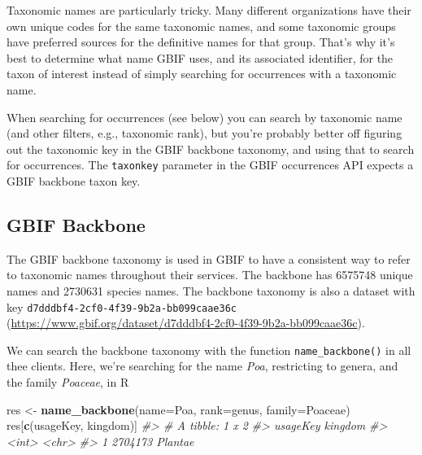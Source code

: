 \documentclass[3p]{elsarticle} %
\newenvironment{Shaded}{\begin{snugshade}}{\end{snugshade}}
\newcommand{\CommentTok}[1]{\textcolor[rgb]{0.56,0.35,0.01}{\textit{#1}}}
\newcommand{\DataTypeTok}[1]{\textcolor[rgb]{0.13,0.29,0.53}{#1}}
\newcommand{\KeywordTok}[1]{\textcolor[rgb]{0.13,0.29,0.53}{\textbf{#1}}}
\newcommand{\NormalTok}[1]{#1}
\newcommand{\StringTok}[1]{\textcolor[rgb]{0.31,0.60,0.02}{#1}}
\begin{document}
Taxonomic names are particularly tricky. Many different organizations
have their own unique codes for the same taxonomic names, and some
taxonomic groups have preferred sources for the definitive names for
that group. That's why it's best to determine what name GBIF uses, and
its associated identifier, for the taxon of interest instead of simply
searching for occurrences with a taxonomic name.

When searching for occurrences (see below) you can search by taxonomic
name (and other filters, e.g., taxonomic rank), but you're probably
better off figuring out the taxonomic key in the GBIF backbone taxonomy,
and using that to search for occurrences. The \texttt{taxonkey}
parameter in the GBIF occurrences API expects a GBIF backbone taxon key.

\hypertarget{gbif-backbone}{%
\subsection{GBIF Backbone}\label{gbif-backbone}}

The GBIF backbone taxonomy is used in GBIF to have a consistent way to
refer to taxonomic names throughout their services. The backbone has
6575748 unique names and 2730631 species names. The backbone taxonomy is
also a dataset with key \texttt{d7dddbf4-2cf0-4f39-9b2a-bb099caae36c}
(\url{https://www.gbif.org/dataset/d7dddbf4-2cf0-4f39-9b2a-bb099caae36c}).

We can search the backbone taxonomy with the function
\texttt{name\_backbone()} in all thee clients. Here, we're searching for
the name \emph{Poa}, restricting to genera, and the family
\emph{Poaceae}, in R

\begin{Shaded}
\begin{Highlighting}[]
\NormalTok{res <{-}}\StringTok{ }\KeywordTok{name\_backbone}\NormalTok{(}\DataTypeTok{name=}\StringTok{\textquotesingle{}Poa\textquotesingle{}}\NormalTok{, }\DataTypeTok{rank=}\StringTok{\textquotesingle{}genus\textquotesingle{}}\NormalTok{, }\DataTypeTok{family=}\StringTok{\textquotesingle{}Poaceae\textquotesingle{}}\NormalTok{)}
\NormalTok{res[}\KeywordTok{c}\NormalTok{(}\StringTok{\textquotesingle{}usageKey\textquotesingle{}}\NormalTok{, }\StringTok{\textquotesingle{}kingdom\textquotesingle{}}\NormalTok{)]}
\CommentTok{\#> \# A tibble: 1 x 2}
\CommentTok{\#>   usageKey kingdom}
\CommentTok{\#>      <int> <chr>  }
\CommentTok{\#> 1  2704173 Plantae}
\end{Highlighting}
\end{Shaded}
\end{document}
